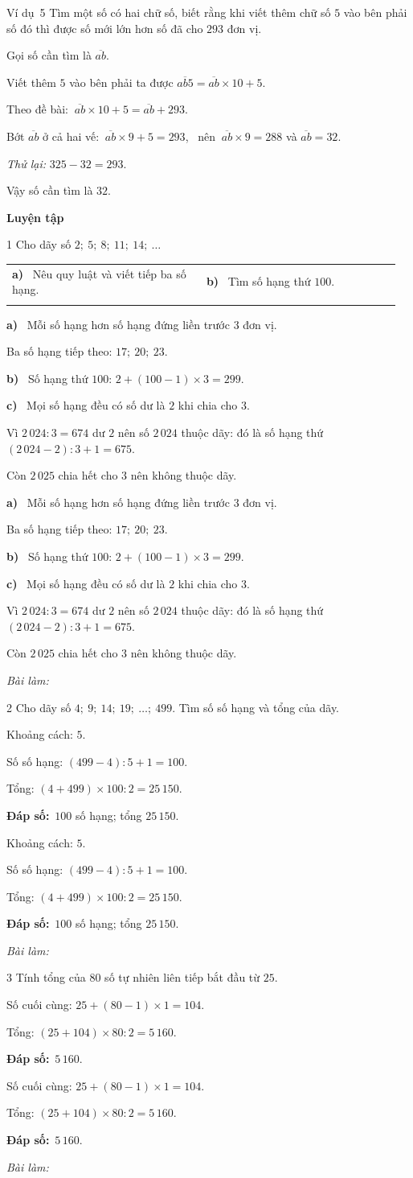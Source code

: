 \documentclass[11pt]{article}
\makeatletter
\newif\ifsol \soltrue
\renewcommand{\arraystretch}{1.35}
\providecommand{\AnsWord}{Đáp số}
\newcommand{\dapso}[1]{\par\textbf{\AnsWord:}\ #1}
\newcommand{\guide}{\par\vspace{4pt}{\bfseries\color{tmBlue}\GuideWord}\par\vspace{3pt}\nopagebreak}
\newcommand{\probsol}[1]{%
  \begin{lrbox}{\solmeasure}\begin{minipage}{\dimexpr\linewidth-24pt\relax}#1\end{minipage}\end{lrbox}%
  \ifsol
    \begin{solbox}#1\end{solbox}%
  \else
    \setlength{\solht}{\dimexpr\ht\solmeasure+\dp\solmeasure+0.85cm\relax}%
    \ifdim\solht<1.35cm\setlength{\solht}{1.35cm}\fi
    \begin{tcolorbox}[colback=white,colframe=Line,boxrule=0.8pt,arc=5pt,
      left=8pt,right=8pt,top=4pt,bottom=4pt,height=\solht]{\footnotesize\color{Slate}\itshape\WorkWord}\end{tcolorbox}%
  \fi}
\newcommand{\dividerbar}[1]{\par\vspace{0.6em}\noindent
  \begin{tcolorbox}[enhanced,frame hidden,interior hidden,borderline west={5pt}{0pt}{ProbBlue},
    colback=white,left=12pt,right=12pt,top=5pt,bottom=5pt,arc=4pt]
  {\large\bfseries\color{ProbBlue} #1}\end{tcolorbox}\vspace{0.4em}}
\newcommand{\nd}[1]{\overline{#1}}
\newcommand{\pa}[1]{\textbf{#1)}\ }
\newenvironment{cols2}{\par\vspace{3pt}\noindent\setlength{\tabcolsep}{0pt}\renewcommand{\arraystretch}{1.3}%
  \begin{tabular}{@{}>{\raggedright\arraybackslash\rule{0pt}{4.4ex}}p{0.48\linewidth}<{\rule[-2.3ex]{0pt}{0pt}}@{\hspace{0.03\linewidth}}>{\raggedright\arraybackslash\rule{0pt}{4.4ex}}p{0.48\linewidth}<{\rule[-2.3ex]{0pt}{0pt}}@{}}}%
  {\end{tabular}\par}
\newcommand{\gap}{\vspace{0.3cm}}
\def\GuideWord{Hướng dẫn giải.}
\def\WorkWord{Bài làm:}
\def\AnsWord{Đáp số}
\def\ExWord{Ví dụ}
\makeatother
\begin{document}
\gap
\begin{exbox}{\ExWord\ 5}
Tìm một số có hai chữ số, biết rằng khi viết thêm chữ số $5$ vào bên phải số đó thì được số mới lớn hơn số đã cho $293$ đơn vị.
\guide
Gọi số cần tìm là $\nd{ab}$.\par Viết thêm $5$ vào bên phải ta được $\nd{ab5}=\nd{ab}\times10+5$.\par
Theo đề bài: $\ \nd{ab}\times10+5=\nd{ab}+293$.\par
Bớt $\nd{ab}$ ở cả hai vế: $\ \nd{ab}\times9+5=293$, \ nên $\ \nd{ab}\times9=288$ và $\nd{ab}=32$.\par
\emph{Thử lại:} $325-32=293$.\par Vậy số cần tìm là $32$.
\end{exbox}
\dividerbar{Luyện tập}
\begin{probbox}{1}{\relax}
Cho dãy số $2;\ 5;\ 8;\ 11;\ 14;\ \dots$
\begin{cols2}
\pa{a} Nêu quy luật và viết tiếp ba số hạng. & \pa{b} Tìm số hạng thứ $100$.\\
\multicolumn{2}{@{}l@{}}{\pa{c} Các số $2\,024$ và $2\,025$ có thuộc dãy không? Nếu có thì đó là số hạng thứ mấy?}
\end{cols2}
\end{probbox}
\probsol{
\pa{a} Mỗi số hạng hơn số hạng đứng liền trước $3$ đơn vị.\par Ba số hạng tiếp theo: $17;\ 20;\ 23$.\par
\pa{b} Số hạng thứ $100$: $2+(100-1)\times3=299$.\par
\pa{c} Mọi số hạng đều có số dư là $2$ khi chia cho $3$.\par Vì $2\,024:3=674$ dư $2$ nên số $2\,024$ thuộc dãy: đó là số hạng thứ $(2\,024-2):3+1=675$.\par Còn $2\,025$ chia hết cho $3$ nên không thuộc dãy.
}
\gap
\begin{probbox}{2}{\relax}
Cho dãy số $4;\ 9;\ 14;\ 19;\ \dots;\ 499$. Tìm số số hạng và tổng của dãy.
\end{probbox}
\probsol{
Khoảng cách: $5$.\par Số số hạng: $(499-4):5+1=100$.\par
Tổng: $(4+499)\times100:2=25\,150$.
\dapso{$100$ số hạng; tổng $25\,150$.}}
\gap
\begin{probbox}{3}{\relax}
Tính tổng của $80$ số tự nhiên liên tiếp bắt đầu từ $25$.
\end{probbox}
\probsol{
Số cuối cùng: $25+(80-1)\times1=104$.\par
Tổng: $(25+104)\times80:2=5\,160$.
\dapso{$5\,160$.}}
\end{document}
